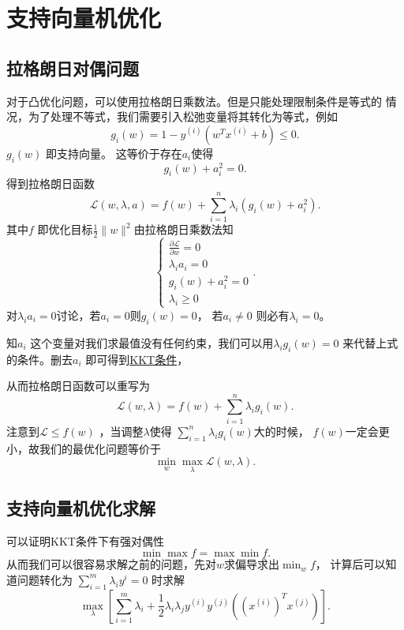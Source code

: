 \section{支持向量机优化} 
\subsection{拉格朗日对偶问题}
对于凸优化问题，可以使用拉格朗日乘数法。但是只能处理限制条件是等式的
情况，为了处理不等式，我们需要引入松弛变量将其转化为等式，例如
\[
		g_{i}\left( w \right)  = 1 - y^{(i)} \left( w^{T}x^{(i)} + b \right)  \le  0
.\] 
$g_{i}\left( w \right) $ 即支持向量。
这等价于存在$a_{i}$使得
\[
		g_{i}\left( w \right)  + a_{i}^2 = 0
.\] 
得到拉格朗日函数
\[
		\mathcal{L} \left( w,\lambda,a \right)  = 
		f\left( w \right)  + \sum_{i=1}^{n} \lambda_{i} \left( g_{i}\left( w \right) + 
		a_{i}^2 \right) 
.\] 
其中$f$ 即优化目标$\frac{1}{2} \|w\|^2 $由拉格朗日乘数法知
\[
\begin{cases}
		\frac{\partial \mathcal{L}}{\partial w} = 0 \\ 
		\lambda_{i} a_{i} = 0 \\
		g_{i} \left( w \right)  + a_{i} ^2 = 0 \\ 
		\lambda_{i} \ge 0
\end{cases}
.\] 
对$\lambda_{i}a_{i} = 0$讨论，若$a_{i}=0$则$g_{i}\left( w \right) =0$，
若$a_{i}\neq 0$ 则必有$\lambda_{i} = 0$。

知$a_{i}$ 这个变量对我们求最值没有任何约束，我们可以用$\lambda_{i}g_{i}\left( w \right) 
=0$ 来代替上式的条件。删去$a_{i}$ 即可得到\href{https://zhuanlan.zhihu.com/p/77750026}{KKT条件}，

从而拉格朗日函数可以重写为
\[
		\mathcal{L}\left( w,\lambda \right) = f(w) + \sum_{i=1}^{n} \lambda_{i}g_{i}\left( w \right) 
.\] 
注意到$\mathcal{L} \le  f\left( w \right) $ ，当调整$\lambda$使得
$\sum_{i=1}^{n} \lambda_{i}g_{i}\left( w \right) $大的时候，
$f\left( w \right) $一定会更小，故我们的最优化问题等价于
\[
		\min_{w} \max_{\lambda} \mathcal{L} \left( w, \lambda \right) 
.\] 
\subsection{支持向量机优化求解} 
可以证明KKT条件下有强对偶性
\[
\min \max f = \max \min f
.\] 
从而我们可以很容易求解之前的问题，先对$w$求偏导求出$\min_{w}f$，
计算后可以知道问题转化为
$
\sum_{i=1}^{m} \lambda_{i} y^{i} = 0
$
时求解
\[
\max_{\lambda} \left[ \sum_{i=1}^{m} \lambda_{i} + 
\frac{1}{2}\lambda_{i}\lambda_{j} y^{(i)} y^{(j)} \left( (x^{(i)})^{T}  x^{(j)} \right)    \right] 
.\] 



